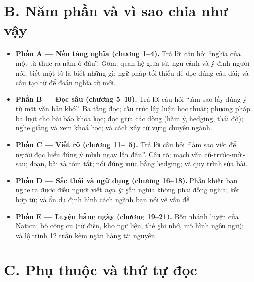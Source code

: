 \documentclass[english.tex]{subfiles}
\begin{document}
\section*{B. Năm phần và vì sao chia như vậy}

\begin{itemize}
\item \textbf{Phần A --- Nền tảng nghĩa (chương 1--4).} Trả lời câu hỏi ``nghĩa của một từ thực ra nằm ở đâu''. Gồm: quan hệ giữa từ, ngữ cảnh và ý định người nói; biết một từ là biết những gì; ngữ pháp tối thiểu để đọc đúng câu dài; và cấu tạo từ để đoán nghĩa từ mới.
\item \textbf{Phần B --- Đọc sâu (chương 5--10).} Trả lời câu hỏi ``làm sao lấy đúng ý từ một văn bản khó''. Ba tầng đọc; cấu trúc lập luận học thuật; phương pháp ba lượt cho bài báo khoa học; đọc giữa các dòng (hàm ý, hedging, thái độ); nghe giảng và xem khoá học; và cách xây từ vựng chuyên ngành.
\item \textbf{Phần C --- Viết rõ (chương 11--15).} Trả lời câu hỏi ``làm sao viết để người đọc hiểu đúng ý mình ngay lần đầu''. Câu rõ; mạch văn cũ-trước-mới-sau; đoạn, bài và tóm tắt; nói đúng mức bằng hedging; và quy trình sửa bài.
\item \textbf{Phần D --- Sắc thái và ngữ dụng (chương 16--18).} Phần khiến bạn nghe ra được điều người viết \emph{ngụ ý}: gần nghĩa không phải đồng nghĩa; kết hợp từ; và ẩn dụ định hình cách ngành bạn nói về vấn đề.
\item \textbf{Phần E --- Luyện hằng ngày (chương 19--21).} Bốn nhánh luyện của Nation; bộ công cụ (từ điển, kho ngữ liệu, thẻ ghi nhớ, mô hình ngôn ngữ); và lộ trình 12 tuần kèm ngân hàng tài nguyên.
\end{itemize}

\section*{C. Phụ thuộc và thứ tự đọc}
\end{document}
